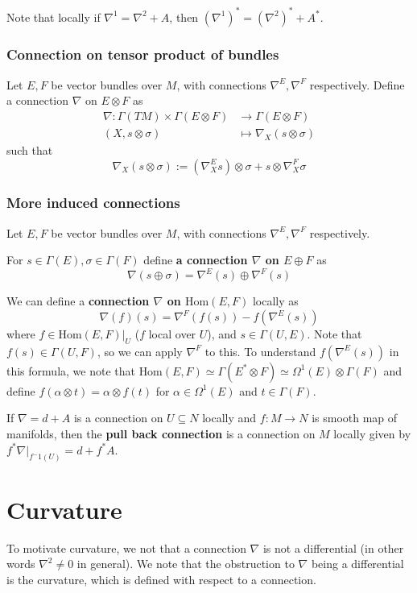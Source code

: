 \documentclass[a4paper]{article}
\theoremstyle{definition} \newtheorem*{definition}{Definition}
\theoremstyle{definition} \newtheorem*{definitions}{Definitions}
\theoremstyle{plain} \newtheorem{theorem}{Theorem}[section]
\theoremstyle{plain} \newtheorem{proposition}[theorem]{Proposition}
\theoremstyle{plain} \newtheorem{corollary}[theorem]{Corollary}
\theoremstyle{plain} \newtheorem{lemma}[theorem]{Lemma}
\theoremstyle{plain} \newtheorem{example}[theorem]{Example}
\newcommand{\defn}[1]{\textbf{#1}}
\newcommand{\Hom}{\text{Hom}}
\begin{document}
Note that locally if $\nabla^1 = \nabla^2 + A$, then $(\nabla^1)^* = (\nabla^2)^* + A^*$.

\subsubsection{Connection on tensor product of bundles}
Let $E, F$ be vector bundles over $M$, with connections $\nabla^E, \nabla^F$ respectively.
Define a connection $\nabla$ on $E\otimes F$ as
\begin{align*}
    \nabla : \Gamma(TM)\times \Gamma(E\otimes F) & \to \Gamma(E\otimes F) \\
    (X, s\otimes \sigma) & \mapsto \nabla_X(s\otimes \sigma)
\end{align*}
such that
$$\nabla_X(s\otimes \sigma):=(\nabla^E_X s)\otimes \sigma + s \otimes \nabla^F_X \sigma $$

\subsubsection{More induced connections}
Let $E, F$ be vector bundles over $M$, with connections $\nabla^E, \nabla^F$ respectively. 

For $s\in \Gamma(E), \sigma \in \Gamma(F)$ define \defn{a connection $\nabla$ on $E\oplus F$} as
$$\nabla(s\oplus \sigma)=\nabla^E(s)\oplus \nabla^F(s)$$

We can define a \defn{connection $\nabla$ on $\Hom(E, F)$} locally as
$$\nabla(f)(s)=\nabla^F(f(s))-f(\nabla^E(s))$$
where $f\in \Hom(E, F)|_U$ ($f$ local over $U$), and $s\in \Gamma(U, E)$. Note that $f(s)\in \Gamma(U, F)$, so we can apply $\nabla^F$ to this. To understand $f(\nabla^E(s))$ in this formula, we note that $\Hom(E, F)\simeq \Gamma(E^*\otimes F) \simeq \Omega^1(E)\otimes \Gamma(F)$ and define $f(\alpha\otimes t)=\alpha \otimes f(t)$ for $\alpha \in \Omega^1(E)$ and $t\in \Gamma(F)$.

If $\nabla = d+A$ is a connection on $U\subseteq N$ locally and $f:M\to N$ is smooth map of manifolds, then the \defn{pull back connection} is a connection on $M$ locally given by $f^*\nabla |_{f^-1(U)}=d+f^*A$.

\section{Curvature}

To motivate curvature, we not that a connection $\nabla$ is not a differential (in other words $\nabla^2\neq 0$ in general). We note that the obstruction to $\nabla$ being a differential is the curvature, which is defined with respect to a connection. 
\end{document}
